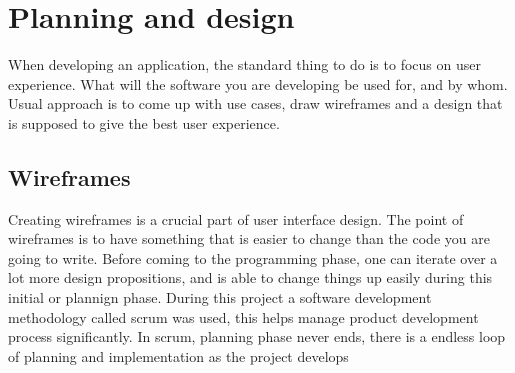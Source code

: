 \chapter{Planning and design}
When developing an application, the standard thing to do is to focus on user experience. What will the software you are developing be used for, and by whom. Usual approach is to come up with use cases, draw wireframes and a design that is supposed to give the best user experience.
\section{Wireframes}
Creating wireframes is a crucial part of user interface design. The point of wireframes is to have something that is easier to change than the code you are going to write. Before coming to the programming phase, one can iterate over a lot more design propositions, and is able to change things up easily during this initial or plannign phase. \newline
During this project a software development methodology called scrum was used, this helps manage product development process significantly. In scrum, planning phase never ends, there is a endless loop of planning and implementation as the project develops \newline

